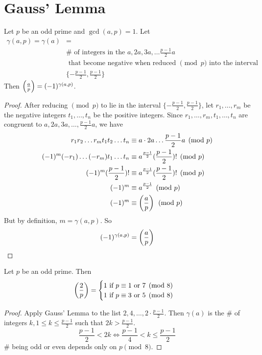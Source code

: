\section{Gauss' Lemma}
    \begin{theorem} 
        Let $p$ be an odd prime and $\gcd(a,p)=1$.
        Let 
        \begin{align*}
            \gamma(a,p)=\gamma(a) &= \\
            &\# \text{ of integers in the } a,2a,3a,\dots\frac{p-1}{2}a \\
            &\text{ that become negative when reduced $\pmod{p}$ into the interval} \\
            &\{ -\frac{p-1}{2},\frac{p-1}{2} \}
        \end{align*}
        Then $\left( \frac{a}{p} \right)  = (-1)^{\gamma(a,p)}$.
        \begin{proof}
            After reducing $\pmod{p}$ to lie in the interval $\{ -\frac{p-1}{2},\frac{p-1}{2} \}$,
            let $r_1,\dots,r_m$ be the negative integers $t_1,\dots,t_n$ be 
            the positive integers.
            Since $r_1,\dots,r_m,t_1,\dots,t_n$ are congruent to $a,2a,3a,\dots,\frac{p-1}{2}a$,
            we have 
            \begin{align*}
                r_1r_2\dots r_mt_1t_2\dots t_n &\equiv a\cdot 2a\dots\frac{p-1}{2}a\pmod{p} \\
                (-1)^m(-r_1)\dots(-r_m)t_1\dots t_n &\equiv a^{\frac{p-1}{2}}(\frac{p-1}{2})!\pmod{p} \\
                (-1)^m(\frac{p-1}{2})! &\equiv a^{\frac{p-1}{2}}(\frac{p-1}{2})!\pmod{p} \\
                (-1)^m &\equiv a^{\frac{p-1}{2}}\pmod{p} \\
                (-1)^m &\equiv \left( \frac{a}{p} \right) \pmod{p}
            \end{align*}
            But by definition, $m=\gamma(a,p)$. 
            So
            \[
                (-1)^{\gamma(a,p)} = \left( \frac{a}{p} \right) 
            \]
        \end{proof}
    \end{theorem}

    \begin{theorem}
        Let $p$ be an odd prime. Then
        \[
            \left( \frac{2}{p} \right)  = 
            \begin{cases}
                1 \text{ if } p\equiv 1 \text{ or } 7\pmod{8} \\
                1 \text{ if } p\equiv 3 \text{ or } 5\pmod{8}
            \end{cases}
        \]
        \begin{proof}
            Apply Gauss' Lemma to the list $2,4,\dots,2\cdot\frac{p-1}{2}$.
            Then $\gamma(a)$ is the \# of integers $k, 1\le k\le \frac{p-1}{2}$
            such that $2k > \frac{p-1}{2}$.
            \[
                \frac{p-1}{2} < 2k \Longleftrightarrow \frac{p-1}{4} < k \le\frac{p-1}{2}
            \]
            \# being odd or even depends only on $p\pmod{8}$.
        \end{proof}
    \end{theorem}

